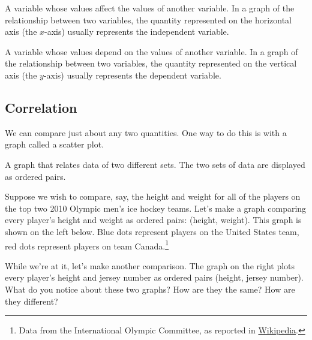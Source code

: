 \begin{boxeddef}
A variable whose values affect the values of another variable. In a graph of the relationship between two variables, the quantity represented on the horizontal axis (the $x$-axis) usually represents the independent variable.
\end{boxeddef}

\begin{boxeddef}
A variable whose values depend on the values of another variable. In a graph of the relationship between two variables, the quantity represented on the vertical axis (the $y$-axis) usually represents the dependent variable.
\end{boxeddef}

\subsection{Correlation}

We can compare just about any two quantities. One way to do this is with a graph called a \gls{scatter plot}.

\begin{boxeddef}
A graph that relates data of two different sets. The two sets of data are displayed as ordered pairs.
\end{boxeddef}

Suppose we wish to compare, say, the height and weight for all of the players on the top two 2010 Olympic men's ice hockey teams. Let's make a graph comparing every player's height and weight as ordered pairs: (height, weight). This graph is shown on the left below. Blue dots represent players on the United States team, red dots represent players on team Canada.\footnote{Data from the International Olympic Committee, as reported in \href{http://en.wikipedia.org/wiki/Ice_hockey_at_the_2010_Winter_Olympics}{Wikipedia}.}

While we're at it, let's make another comparison. The graph on the right plots every player's height and jersey number as ordered pairs (height, jersey number). What do you notice about these two graphs? How are they the same? How are they different?

